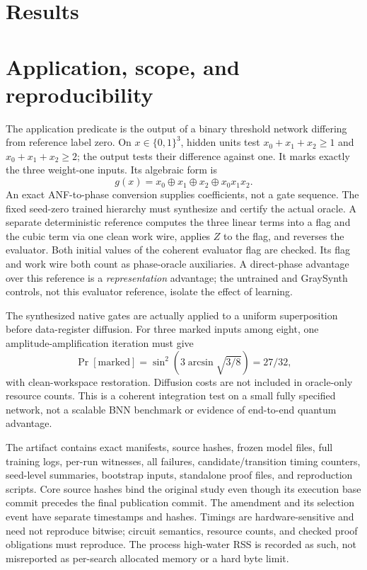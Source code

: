 \documentclass[11pt]{article}
\theoremstyle{definition}\newtheorem{definition}[theorem]{Definition}
\begin{document}
\section{Results}


\section{Application, scope, and reproducibility}
The application predicate is the output of a binary threshold network differing from reference label zero. On $x\in\{0,1\}^3$, hidden units test $x_0+x_1+x_2\ge1$ and $x_0+x_1+x_2\ge2$; the output tests their difference against one. It marks exactly the three weight-one inputs. Its algebraic form is
\begin{equation}
g(x)=x_0\oplus x_1\oplus x_2\oplus x_0x_1x_2.
\end{equation}
An exact ANF-to-phase conversion supplies coefficients, not a gate sequence. The fixed seed-zero trained hierarchy must synthesize and certify the actual oracle. A separate deterministic reference computes the three linear terms into a flag and the cubic term via one clean work wire, applies $Z$ to the flag, and reverses the evaluator. Both initial values of the coherent evaluator flag are checked. Its flag and work wire both count as phase-oracle auxiliaries. A direct-phase advantage over this reference is a \emph{representation} advantage; the untrained and GraySynth controls, not this evaluator reference, isolate the effect of learning.

The synthesized native gates are actually applied to a uniform superposition before data-register diffusion. For three marked inputs among eight, one amplitude-amplification iteration must give
\begin{equation}
\Pr[\text{marked}]=\sin^2\!\left(3\arcsin\sqrt{3/8}\right)=27/32,
\end{equation}
with clean-workspace restoration. Diffusion costs are not included in oracle-only resource counts. This is a coherent integration test on a small fully specified network, not a scalable BNN benchmark or evidence of end-to-end quantum advantage.

The artifact contains exact manifests, source hashes, frozen model files, full training logs, per-run witnesses, all failures, candidate/transition timing counters, seed-level summaries, bootstrap inputs, standalone proof files, and reproduction scripts. Core source hashes bind the original study even though its execution base commit precedes the final publication commit. The amendment and its selection event have separate timestamps and hashes. Timings are hardware-sensitive and need not reproduce bitwise; circuit semantics, resource counts, and checked proof obligations must reproduce. The process high-water RSS is recorded as such, not misreported as per-search allocated memory or a hard byte limit.
\end{document}
